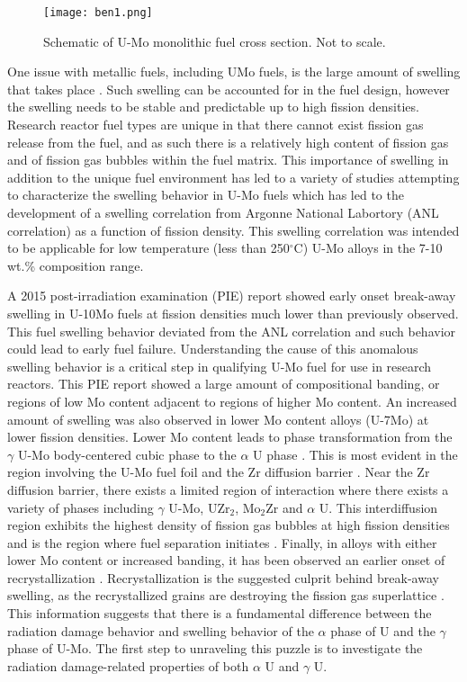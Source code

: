 \documentclass[review]{elsarticle}
\begin{document}
\begin{figure}[!h]
 \centering
 \texttt{[image: ben1.png]} %
 \caption{Schematic of U-Mo monolithic fuel cross section. Not to scale.}
 \label{fig:ben1}
\end{figure}

\FloatBarrier

One issue with metallic fuels, including UMo fuels, is the large amount of swelling that takes place \cite{hofman1997}. Such swelling can be accounted for in the fuel design, however the swelling needs to be stable and predictable up to high fission densities. Research reactor fuel types are unique in that there cannot exist fission gas release from the fuel, and as such there is a relatively high content of fission gas and of fission gas bubbles within the fuel matrix. This importance of swelling in addition to the unique fuel environment has led to a variety of studies attempting to characterize the swelling behavior in U-Mo fuels \cite{rest2009, kim_anl08, meyer2002, kim2013} which has led to the development of a swelling correlation from Argonne National Labortory (ANL correlation) \cite{kim2011} as a function of fission density. This swelling correlation was intended to be applicable for low temperature (less than 250$^{\circ}$C) U-Mo alloys in the 7-10 wt.\% composition range. 

A 2015 post-irradiation examination (PIE) report \cite{afip6report} showed early onset break-away swelling in U-10Mo fuels at fission densities much lower than previously observed. This fuel swelling behavior deviated from the ANL correlation and such behavior could lead to early fuel failure. Understanding the cause of this anomalous swelling behavior is a critical step in qualifying U-Mo fuel for use in research reactors. This PIE report showed a large amount of compositional banding, or regions of low Mo content adjacent to regions of higher Mo content. An increased amount of swelling was also observed in lower Mo content alloys (U-7Mo) \cite{vandenberghe2014} at lower fission densities. Lower Mo content leads to phase transformation from the $\gamma$ U-Mo body-centered cubic phase to the $\alpha$ U phase \cite{janfong2014}. This is most evident in the region involving the U-Mo fuel foil and the Zr diffusion barrier \cite{park2015}. Near the Zr diffusion barrier, there exists a limited region of interaction where there exists a variety of phases including $\gamma$ U-Mo, UZr$_{2}$, Mo$_{2}$Zr and $\alpha$ U. This interdiffusion region exhibits the highest density of fission gas bubbles at high fission densities and is the region where fuel separation initiates \cite{rertr12}. Finally, in alloys with either lower Mo content or increased banding, it has been observed an earlier onset of recrystallization \cite{kim2013A}. Recrystallization is the suggested culprit behind break-away swelling, as the recrystallized grains are destroying the fission gas superlattice \cite{vandenberghe2008}. This information suggests that there is a fundamental difference between the radiation damage behavior and swelling behavior of the $\alpha$ phase of U and the $\gamma$ phase of U-Mo. The first step to unraveling this puzzle is to investigate the radiation damage-related properties of both $\alpha$ U and $\gamma$ U.
\end{document}
